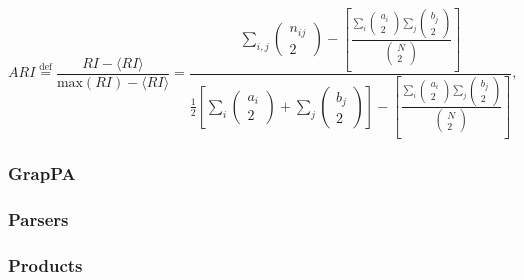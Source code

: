 \documentclass[8pt]{refart}
\begin{document}
\begin{equation}
    ARI \stackrel{\mathrm{def}}{=} \frac{RI - \langle RI\rangle}{\mathrm{max}(RI) - \langle RI\rangle} = \frac{\sum_{i,j}\begin{pmatrix}n_{ij}\\2\end{pmatrix} - \left[\frac{\sum_i\begin{pmatrix}a_i\\2\end{pmatrix}\sum_j\begin{pmatrix}b_j\\2\end{pmatrix}}{\begin{pmatrix}N \\ 2\end{pmatrix}}\right]}{\frac{1}{2}\left[\sum_i\begin{pmatrix}a_i\\2\end{pmatrix} + \sum_j\begin{pmatrix}b_j \\ 2 \end{pmatrix}\right]- \left[\frac{\sum_i\begin{pmatrix}a_i\\2\end{pmatrix}\sum_j\begin{pmatrix}b_j\\2\end{pmatrix}}{\begin{pmatrix}N\\2\end{pmatrix}}\right]},
\end{equation}





\subsubsection{GrapPA}\label{grappa}




\subsubsection{Parsers}

\subsubsection{Products}
\end{document}
